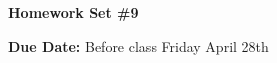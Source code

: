 

\def\xyprime{\ensuremath{\begin{pmatrix} x' \\ y' \end{pmatrix}}}



\thispagestyle{fancy}






\begin{center}
{\huge \textbf{Homework Set \#9}}
\large

{\textbf{ Due Date:} Before class Friday April 28th  }
\end{center}

